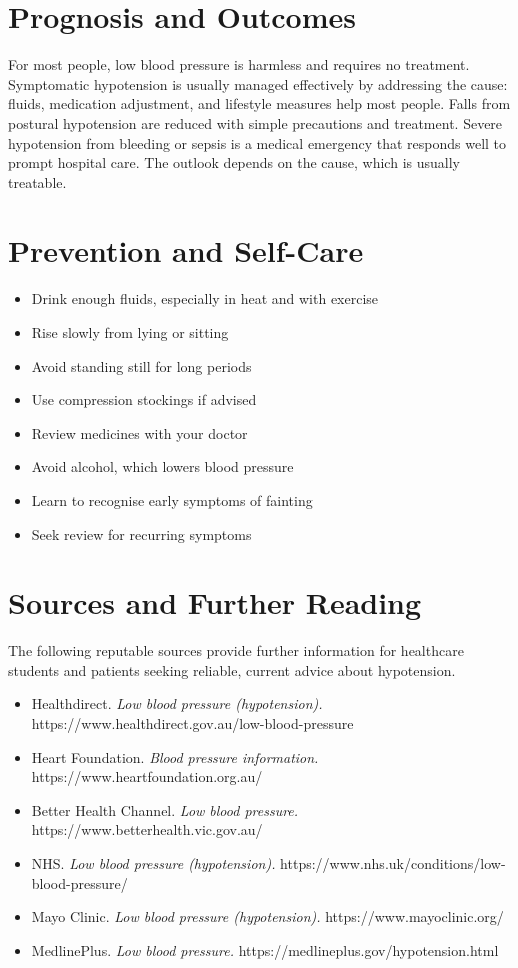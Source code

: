 \section*{Prognosis and Outcomes}
For most people, low blood pressure is harmless and requires no treatment. Symptomatic hypotension is usually managed effectively by addressing the cause: fluids, medication adjustment, and lifestyle measures help most people. Falls from postural hypotension are reduced with simple precautions and treatment. Severe hypotension from bleeding or sepsis is a medical emergency that responds well to prompt hospital care. The outlook depends on the cause, which is usually treatable.

\section*{Prevention and Self-Care}
\begin{itemize}
    \item Drink enough fluids, especially in heat and with exercise
    \item Rise slowly from lying or sitting
    \item Avoid standing still for long periods
    \item Use compression stockings if advised
    \item Review medicines with your doctor
    \item Avoid alcohol, which lowers blood pressure
    \item Learn to recognise early symptoms of fainting
    \item Seek review for recurring symptoms
\end{itemize}

\section*{Sources and Further Reading}
The following reputable sources provide further information for healthcare students and patients seeking reliable, current advice about hypotension.

\begin{itemize}
    \item Healthdirect. \textit{Low blood pressure (hypotension).} https://www.healthdirect.gov.au/low-blood-pressure
    \item Heart Foundation. \textit{Blood pressure information.} https://www.heartfoundation.org.au/
    \item Better Health Channel. \textit{Low blood pressure.} https://www.betterhealth.vic.gov.au/
    \item NHS. \textit{Low blood pressure (hypotension).} https://www.nhs.uk/conditions/low-blood-pressure/
    \item Mayo Clinic. \textit{Low blood pressure (hypotension).} https://www.mayoclinic.org/
    \item MedlinePlus. \textit{Low blood pressure.} https://medlineplus.gov/hypotension.html
\end{itemize}
